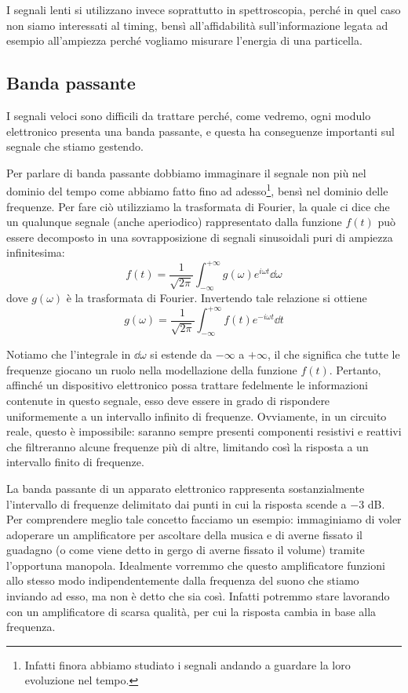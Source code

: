 I segnali lenti si utilizzano invece soprattutto in spettroscopia, perché in quel caso non siamo interessati al timing, bensì all'affidabilità sull'informazione legata ad esempio all'ampiezza perché vogliamo misurare l'energia di una particella.

\subsection{Banda passante}
I segnali veloci sono difficili da trattare perché, come vedremo, ogni modulo elettronico presenta una banda passante, e questa ha conseguenze importanti sul segnale che stiamo gestendo.

Per parlare di banda passante dobbiamo immaginare il segnale non più nel dominio del tempo come abbiamo fatto fino ad adesso\footnote{Infatti finora abbiamo studiato i segnali andando a guardare la loro evoluzione nel tempo.}, bensì nel dominio delle frequenze. Per fare ciò utilizziamo la trasformata di Fourier, la quale ci dice che un qualunque segnale (anche aperiodico) rappresentato dalla funzione $f(t)$ può essere decomposto in una sovrapposizione di segnali sinusoidali puri di ampiezza infinitesima:
\begin{equation*}
   f(t)=\frac{1}{\sqrt{2\pi}} \int_{-\infty}^{+\infty} g(\omega) e^{i \omega t} \dd{\omega}
\end{equation*}
dove $g(\omega)$ è la trasformata di Fourier. Invertendo tale relazione si ottiene
\begin{equation*}
   g(\omega)=\frac{1}{\sqrt{2\pi}} \int_{-\infty}^{+\infty} f(t) e^{-i \omega t} \dd{t}
\end{equation*}

Notiamo che l'integrale in $\dd{\omega}$ si estende da $-\infty$ a $+\infty$, il che significa che tutte le frequenze giocano un ruolo nella modellazione della funzione $f(t)$. Pertanto, affinché un dispositivo elettronico possa trattare fedelmente le informazioni contenute in questo segnale, esso deve essere in grado di rispondere uniformemente a un intervallo infinito di frequenze. Ovviamente, in un circuito reale, questo è impossibile: saranno sempre presenti componenti resistivi e reattivi che filtreranno alcune frequenze più di altre, limitando così la risposta a un intervallo finito di frequenze.

La banda passante di un apparato elettronico rappresenta sostanzialmente l'intervallo di frequenze delimitato dai punti in cui la risposta scende a $-3$ dB. Per comprendere meglio tale concetto facciamo un esempio: immaginiamo di voler adoperare un amplificatore per ascoltare della musica e di averne fissato il guadagno (o come viene detto in gergo di averne fissato il volume) tramite l'opportuna manopola. Idealmente vorremmo che questo amplificatore funzioni allo stesso modo indipendentemente dalla frequenza del suono che stiamo inviando ad esso, ma non è detto che sia così. Infatti potremmo stare lavorando con un amplificatore di scarsa qualità, per cui la risposta cambia in base alla frequenza.

